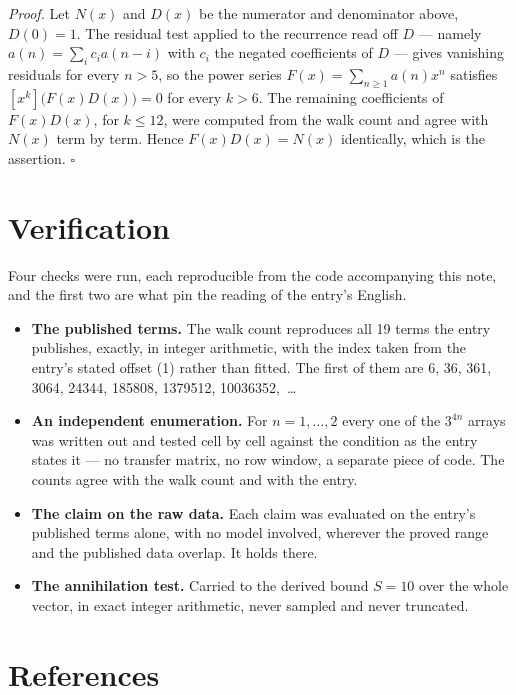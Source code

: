 \documentclass[11pt]{article}
\theoremstyle{definition}
\begin{document}
{\itshape Proof.} Let $N(x)$ and $D(x)$ be the numerator and denominator above, $D(0)=1$. The residual test applied to the recurrence read off $D$ --- namely $a(n) = \sum_i c_i a(n-i)$ with $c_i$ the negated coefficients of $D$ --- gives vanishing residuals for every $n > 5$, so the power series $F(x)=\sum_{n\ge 1}a(n)x^n$ satisfies $[x^k]\bigl(F(x)D(x)\bigr) = 0$ for every $k > 6$. The remaining coefficients of $F(x)D(x)$, for $k \le 12$, were computed from the walk count and agree with $N(x)$ term by term. Hence $F(x)D(x) = N(x)$ identically, which is the assertion. $\square$

\section{Verification}

Four checks were run, each reproducible from the code accompanying this note, and the first two are what pin the reading of the entry's English.

\begin{itemize}

\item {\bfseries The published terms.} The walk count reproduces all 19 terms the entry publishes, exactly, in integer arithmetic, with the index taken from the entry's stated offset (1) rather than fitted. The first of them are 6, 36, 361, 3064, 24344, 185808, 1379512, 10036352,~\dots

\item {\bfseries An independent enumeration.} For $n = 1,\dots,2$ every one of the $3^{4n}$ arrays was written out and tested cell by cell against the condition as the entry states it --- no transfer matrix, no row window, a separate piece of code. The counts agree with the walk count and with the entry.

\item {\bfseries The claim on the raw data.} Each claim was evaluated on the entry's published terms alone, with no model involved, wherever the proved range and the published data overlap. It holds there.

\item {\bfseries The annihilation test.} Carried to the derived bound $S = 10$ over the whole vector, in exact integer arithmetic, never sampled and never truncated.

\end{itemize}

\section{References}
\end{document}
